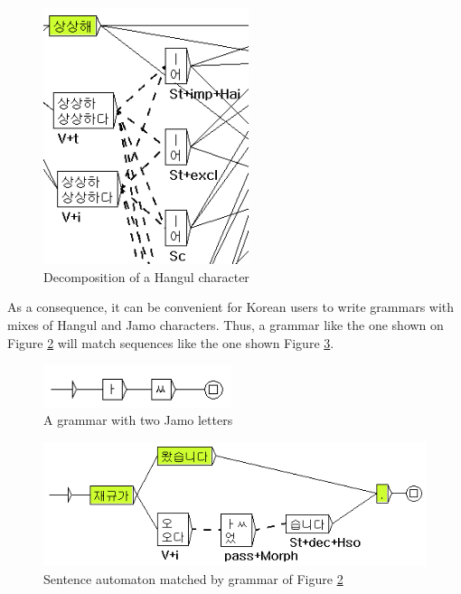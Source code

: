 \begin{figure}[!ht]
\begin{center}
\includegraphics[width=6cm]{resources/img/fig7-korean2.png}
\caption{Decomposition of a Hangul character\label{fig7-korean2}}
\end{center}
\end{figure}

\bigskip
\noindent As a consequence, it can be convenient for Korean users to write
grammars with mixes of Hangul and Jamo characters. Thus, a grammar like the one shown on
Figure \ref{fig7-korean3} will match sequences like the one shown Figure 
\ref{fig7-korean4}.

\begin{figure}[!ht]
\begin{center}
\includegraphics[width=5.5cm]{resources/img/fig7-korean3.png}
\caption{A grammar with two Jamo letters\label{fig7-korean3}}
\end{center}
\end{figure}

\begin{figure}[!ht]
\begin{center}
\includegraphics[width=13cm]{resources/img/fig7-korean4.png}
\caption{Sentence automaton matched by grammar of
Figure \ref{fig7-korean3}\label{fig7-korean4}}
\end{center}
\end{figure}

